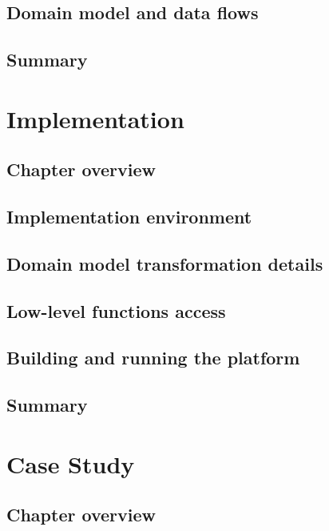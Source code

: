 \documentclass[11pt]{book}
\begin{document}
    \section{Domain model and data flows} \label{sec:domain-model}


    \section*{Summary}


  \chapter{Implementation}
    
    \section*{Chapter overview}


    \section{Implementation environment}


    \section{Domain model transformation details}


    \section{Low-level functions access}


    \section{Building and running the platform}


    \section*{Summary}


  \chapter{Case Study}

    \section*{Chapter overview}
\end{document}
